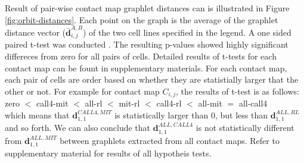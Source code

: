 \documentclass[a4,center,fleqn]{NAR}
\begin{document}
Result of pair-wise contact map graphlet distances can is
illustrated in Figure \ref{fig:orbit-distances}.
Each point on the graph is the
average of the graphlet distance vector 
($\bar{\mathbf{d}}^{A,B}_{i,j}$)
of the two cell lines specified in the legend.
 A one sided paired t-test
was conducted . The resulting p-values showed highly 
significant differeces from zero for all pairs of
cells. Detailed results of t-tests for each
contact map can be fount in supplementary materials.
For each contact map, each pair of cells are
order based on whether they are statistially
larger that the other or not. For example
for contact map $C_{i,j}$, the results 
of t-test is as follows:\\
\smallskip
{
    \small
zero  $<$  call4-mit  $<$     all-rl  $<$     mit-rl  $<$   call4-rl  $<$    all-mit  $=$  all-call4
}\\
\smallskip
which means that $\mathbf{d}^{\scriptscriptstyle CALL4, MIT}_{1,1}$ is statistically larger than 0,
but less than $\mathbf{d}^{\scriptscriptstyle ALL, RL}_{1,1}$ 
and so forth. We can also conclude that $\mathbf{d}^{\scriptscriptstyle ALL, CALL4}_{1,1}$ is not
statistically different from $\mathbf{d}^{\scriptscriptstyle ALL, MIT}_{1,1}$
between graphlets extracted from all contact maps. 
Refer to supplementary
material for results of all hypotheis tests.
\end{document}
